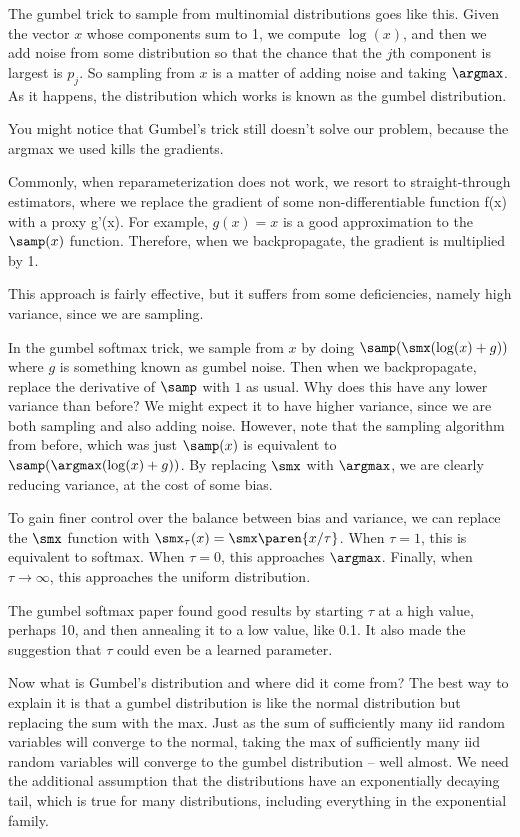 \documentclass[12pt]{article}
\begin{document}
The gumbel trick to sample from multinomial distributions goes like this. Given the vector $x$ whose components sum to 1, we compute $\log(x)$, and then we add noise from some distribution so that the chance that the $j$th component is largest is $p_j$. So sampling from $x$ is a matter of adding noise and taking $\argmax$. As it happens, the distribution which works is known as the gumbel distribution.

You might notice that Gumbel's trick still doesn't solve our problem, because the argmax we used kills the gradients. 

Commonly, when reparameterization does not work, we resort to straight-through estimators, where we replace the gradient of some non-differentiable function f(x) with a proxy g'(x). For example, $g(x) = x$ is a good approximation to the $\samp(x)$ function. Therefore, when we backpropagate, the gradient is multiplied by 1.

This approach is fairly effective, but it suffers from some deficiencies, namely high variance, since we are sampling.

In the gumbel softmax trick, we sample from $x$ by doing $\samp(\smx(\log(x)+g))$ where $g$ is something known as gumbel noise. Then when we backpropagate, replace the derivative of $\samp$ with $1$ as usual. Why does this have any lower variance than before? We might expect it to have higher variance, since we are both sampling and also adding noise. However, note that the sampling algorithm from before, which was just $\samp(x)$ is equivalent to $\samp(\argmax(\log(x)+g))$. By replacing $\smx$ with $\argmax$, we are clearly reducing variance, at the cost of some bias.

To gain finer control over the balance between bias and variance, we can replace the $\smx$ function with $\smx_\tau(x) = \smx\paren{x/\tau}$. When $\tau = 1$, this is equivalent to softmax. When $\tau = 0$, this approaches $\argmax$. Finally, when $\tau \rightarrow \infty$, this approaches the uniform distribution.

The gumbel softmax paper found good results by starting $\tau$ at a high value, perhaps 10, and then annealing it to a low value, like 0.1. It also made the suggestion that $\tau$ could even be a learned parameter. 

Now what is Gumbel's distribution and where did it come from? The best way to explain it is that a gumbel distribution is like the normal distribution but replacing the sum with the max. Just as the sum of sufficiently many iid random variables will converge to the normal, taking the max of sufficiently many iid random variables will converge to the gumbel distribution -- well almost. We need the additional assumption that the distributions have an exponentially decaying tail, which is true for many distributions, including everything in the exponential family.
\end{document}
